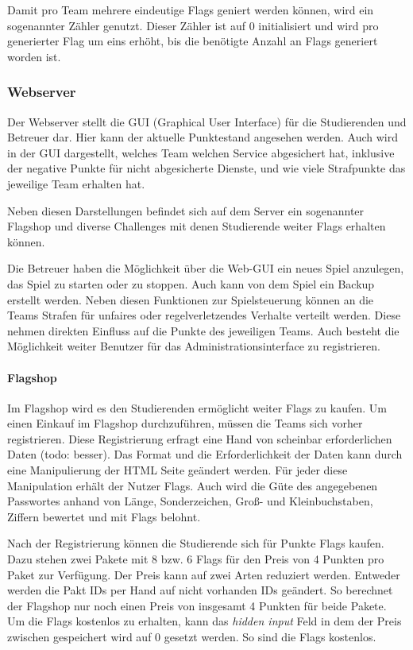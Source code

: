 Damit pro Team mehrere eindeutige Flags geniert werden können, wird ein sogenannter Zähler genutzt. Dieser Zähler ist auf 0 initialisiert und wird pro generierter Flag um eins erhöht, bis die benötigte Anzahl an Flags generiert worden ist.\cite[S.48]{sosnaKonzeptionUndRealisierung2010}

\subsubsection{Webserver}\label{subsubsec:Webserver}

Der Webserver stellt die GUI (Graphical User Interface) für die Studierenden und Betreuer dar. Hier kann der aktuelle Punktestand angesehen werden. Auch wird in der GUI dargestellt, welches Team welchen Service abgesichert hat, inklusive der negative Punkte für nicht abgesicherte Dienste, und wie viele Strafpunkte das jeweilige Team erhalten hat.

Neben diesen Darstellungen befindet sich auf dem Server ein sogenannter Flagshop und diverse Challenges mit denen Studierende weiter Flags erhalten können.

Die Betreuer haben die Möglichkeit über die Web-GUI ein neues Spiel anzulegen, das Spiel zu starten oder zu stoppen. Auch kann von dem Spiel ein Backup erstellt werden. Neben diesen Funktionen zur Spielsteuerung können an die Teams Strafen für unfaires oder regelverletzendes Verhalte verteilt werden. Diese nehmen direkten Einfluss auf die Punkte des jeweiligen Teams. Auch besteht die Möglichkeit weiter Benutzer für das Administrationsinterface zu registrieren.

\paragraph{Flagshop} \label{para:Flagshop}
Im Flagshop wird es den Studierenden ermöglicht weiter Flags zu kaufen. Um einen Einkauf im Flagshop durchzuführen, müssen die Teams sich vorher registrieren. Diese Registrierung erfragt eine Hand von scheinbar erforderlichen Daten (todo: besser). Das Format und die Erforderlichkeit der Daten kann durch eine Manipulierung der HTML Seite geändert werden. Für jeder diese Manipulation erhält der Nutzer Flags. Auch wird die Güte des angegebenen Passwortes anhand von Länge, Sonderzeichen, Groß- und Kleinbuchstaben, Ziffern bewertet und mit Flags belohnt.

Nach der Registrierung können die Studierende sich für Punkte Flags kaufen. Dazu stehen zwei Pakete mit 8 bzw. 6 Flags für den Preis von 4 Punkten pro Paket zur Verfügung. Der Preis kann auf zwei Arten reduziert werden. Entweder werden die Pakt IDs per Hand auf nicht vorhanden IDs geändert. So berechnet der Flagshop nur noch einen Preis von insgesamt 4 Punkten für beide Pakete. Um die Flags kostenlos zu erhalten, kann das \textit{hidden input} Feld in dem der Preis zwischen gespeichert wird auf 0 gesetzt werden. So sind die Flags kostenlos. \cite[S. 63]{abtsUeberarbeitungUndErweiterung2016}

